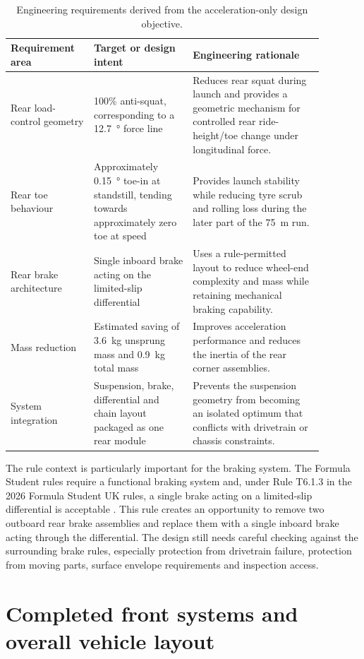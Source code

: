 \begin{table}[H]
\caption{Engineering requirements derived from the acceleration-only design objective.}
\label{tab:reqs}
\centering
\begin{tabular}{p{0.23\linewidth}p{0.28\linewidth}p{0.37\linewidth}}
\toprule
Requirement area & Target or design intent & Engineering rationale \\
\midrule
Rear load-control geometry & 100\% anti-squat, corresponding to a \SI{12.7}{\degree} force line & Reduces rear squat during launch and provides a geometric mechanism for controlled rear ride-height/toe change under longitudinal force. \\
Rear toe behaviour & Approximately \SI{0.15}{\degree} toe-in at standstill, tending towards approximately zero toe at speed & Provides launch stability while reducing tyre scrub and rolling loss during the later part of the \SI{75}{m} run. \\
Rear brake architecture & Single inboard brake acting on the limited-slip differential & Uses a rule-permitted layout to reduce wheel-end complexity and mass while retaining mechanical braking capability. \\
Mass reduction & Estimated saving of \SI{3.6}{kg} unsprung mass and \SI{0.9}{kg} total mass & Improves acceleration performance and reduces the inertia of the rear corner assemblies. \\
System integration & Suspension, brake, differential and chain layout packaged as one rear module & Prevents the suspension geometry from becoming an isolated optimum that conflicts with drivetrain or chassis constraints. \\
\bottomrule
\end{tabular}
\end{table}

The rule context is particularly important for the braking system. The Formula Student rules require a functional braking system and, under Rule T6.1.3 in the 2026 Formula Student UK rules, a single brake acting on a limited-slip differential is acceptable \parencite{imecheFS2026Rules}. This rule creates an opportunity to remove two outboard rear brake assemblies and replace them with a single inboard brake acting through the differential. The design still needs careful checking against the surrounding brake rules, especially protection from drivetrain failure, protection from moving parts, surface envelope requirements and inspection access.

\section{Completed front systems and overall vehicle layout}

